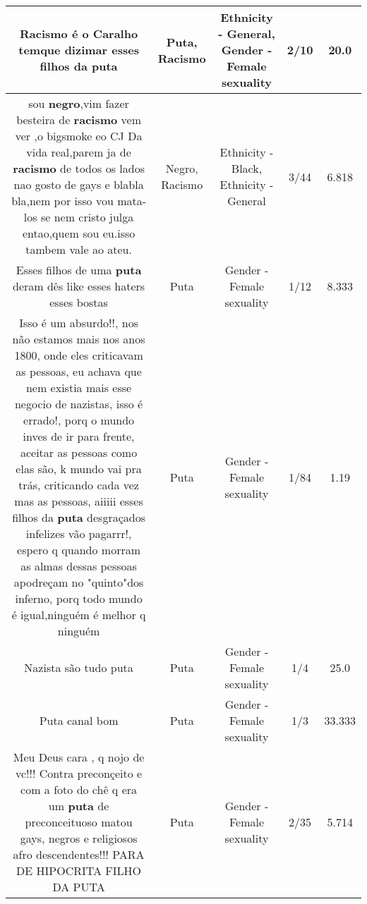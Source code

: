 \documentclass[11pt]{article}
\newlength\mylength
\begin{document}
\begin{center}
\begin{longtable}{|C{.65\mylength}|C{.30\mylength}|C{.12\mylength}|C{.12\mylength}|C{.12\mylength}|}
  \small Racismo é o Caralho temque dizimar esses filhos da puta\normalsize   & Puta, Racismo & Ethnicity - General, Gender - Female sexuality & 2/10 & 20.0 \\  \hline
  \small sou \textbf{negro},vim fazer besteira de \textbf{racismo} vem ver ,o bigsmoke eo CJ Da vida real,parem ja de \textbf{racismo} de todos os lados nao gosto de gays e blabla bla,nem por isso vou mata-los se nem cristo julga entao,quem sou eu.isso tambem vale ao ateu.\normalsize   & Negro, Racismo & Ethnicity - Black, Ethnicity - General & 3/44 & 6.818 \\  \hline
  \small Esses filhos de uma \textbf{puta} deram dês like esses haters esses bostas\normalsize   & Puta & Gender - Female sexuality & 1/12 & 8.333 \\  \hline
  \small Isso é um absurdo!!, nos não estamos mais nos anos 1800, onde eles criticavam as pessoas, eu achava que nem existia mais esse negocio de nazistas, isso é errado!, porq o mundo inves de ir para frente, aceitar as pessoas como elas são, k mundo vai pra trás, criticando cada vez mas as pessoas, aiiiii esses filhos da \textbf{puta} desgraçados infelizes vão pagarrr!, espero q quando morram as almas dessas pessoas apodreçam no "quinto"dos inferno, porq todo mundo é igual,ninguém é melhor q ninguém\normalsize   & Puta & Gender - Female sexuality & 1/84 & 1.19 \\  \hline
  \small Nazista são tudo puta\normalsize   & Puta & Gender - Female sexuality & 1/4 & 25.0 \\  \hline
  \small Puta canal bom\normalsize   & Puta & Gender - Female sexuality & 1/3 & 33.333 \\  \hline
  \small Meu Deus cara , q nojo de vc!!! Contra preconçeito e com a foto do chê q era um \textbf{puta} de preconceituoso matou gays, negros e religiosos afro descendentes!!! PARA DE HIPOCRITA FILHO DA PUTA\normalsize   & Puta & Gender - Female sexuality & 2/35 & 5.714 \\  \hline

\end{longtable}
\end{center}
\end{document}
